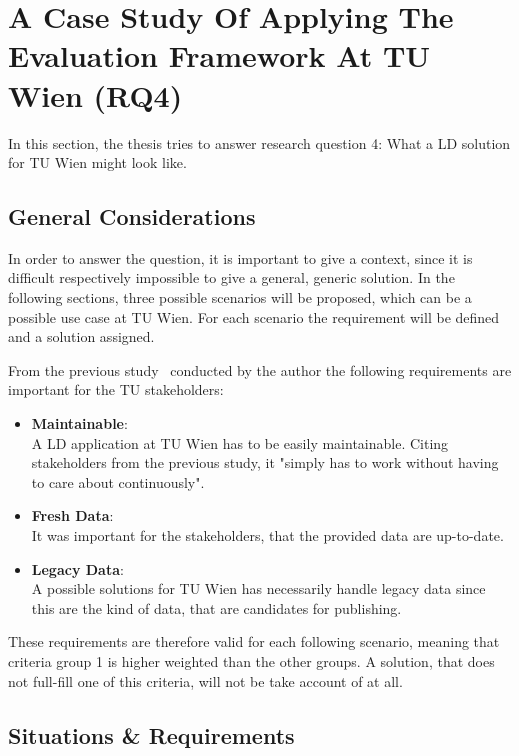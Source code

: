 \chapter{A Case Study Of Applying The Evaluation Framework At TU Wien (RQ4)}\label{ch:tuwien}

In this section, the thesis tries to answer research question 4: What a LD solution for TU Wien might look like.

\section{General Considerations}
In order to answer the question, it is important to give a context, since it is difficult respectively impossible to give a general, generic solution. In the following sections, three possible scenarios will be proposed, which can be a possible use case at TU Wien. For each scenario the requirement will be defined and a solution assigned.

From the previous study~\cite{baronyai_publishing_2016} conducted by the author the following requirements are important for the TU stakeholders:

\begin{itemize}

\item \textbf{Maintainable}: \\
A LD application at TU Wien has to be easily maintainable. Citing stakeholders from the previous study, it "simply has to work without having to care about continuously".

\item \textbf{Fresh Data}: \\
It was important for the stakeholders, that the provided data are up-to-date.

\item \textbf{Legacy Data}: \\
A possible solutions for TU Wien has necessarily handle legacy data since this are the kind of data, that are candidates for publishing.

\end{itemize}

These requirements are therefore valid for each following scenario, meaning that criteria group 1 is higher weighted than the other groups. A solution, that does not full-fill one of this criteria, will not be take account of at all.

\section{Situations \& Requirements}

